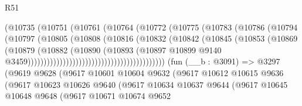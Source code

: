 \begin{lexlean}{R51}
\begin{coremodule}
                                            (@10735
                                              (@10751
                                                (@10761
                                                  (@10764
                                                    (@10772
                                                      (@10775
                                                        (@10783
                                                          (@10786
                                                            (@10794
                                                              (@10797
                                                                (@10805
                                                                  (@10808
                                                                    (@10816
                                                                      (@10832
                                                                        (@10842
                                                                          (@10845
                                                                            (@10853
                                                                              (@10869
                                                                                (@10879
                                                                                  (@10882
                                                                                    (@10890
                                                                                      (@10893
                                                                                        (@10897
                                                                                          @10899
                                                                                          @9140
                                                                                          @3459)))))))))))))))))))))))))))))))))))))))))))
    (fun (__b : @3091) =>
    @3297
      (@9619
        @9628
        (@9617
          @10601
          @10604
          @9632
          (@9617
            @10612
            @10615
            @9636
            (@9617
              @10623
              @10626
              @9640
              (@9617
                @10634
                @10637
                @9644
                (@9617
                  @10645
                  @10648
                  @9648
                  (@9617
                    @10671
                    @10674
                    @9652

\end{coremodule}
\end{lexlean}
